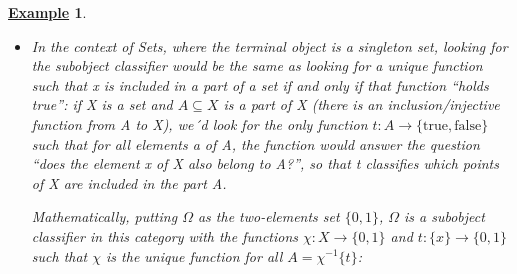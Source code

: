 \documentclass{article}
\newtheorem{example}{\underline{Example}}
\begin{document}
\begin{example}
	\begin{itemize}
		\item[1)] In the context of Sets, where the terminal object is a singleton set, looking for the subobject classifier would be the same as looking for a unique function such that x is included in a part of a set if and only if that function ``holds true'': if X is a set and \(A\subseteq X\) is a part of X (there is an inclusion/injective function from A to X), we´d look for the only function \(t:A\rightarrow \{\text{true}, \text{false}\}\) such that for all elements a of A, the function would answer the question ``does the element x of X also belong to A?'', so that t \textit{classifies} which points of X are included in the part A.

		      Mathematically, putting \(\Omega \) as the two-elements set \(\{0, 1\}\), \(\Omega \) is a subobject classifier in this category with the functions \(\chi:X\rightarrow \{0,1\}\) and \(t:\{x\}\rightarrow \{0,1\}\) such that \(\chi \) is the unique function for all \(A=\chi^{-1}\{t\}\):
		      \begin{center}
\end{center}
\end{itemize}
\end{example}
\end{document}
